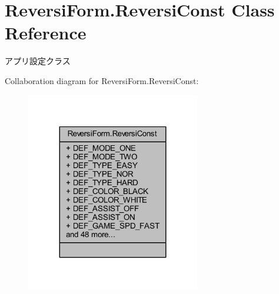 \hypertarget{class_reversi_form_1_1_reversi_const}{}\section{Reversi\+Form.\+Reversi\+Const Class Reference}
\label{class_reversi_form_1_1_reversi_const}


アプリ設定クラス  




Collaboration diagram for Reversi\+Form.\+Reversi\+Const\+:\nopagebreak
\begin{figure}[H]
\begin{center}
\leavevmode
\includegraphics[width=215pt]{class_reversi_form_1_1_reversi_const__coll__graph}
\end{center}
\end{figure}
